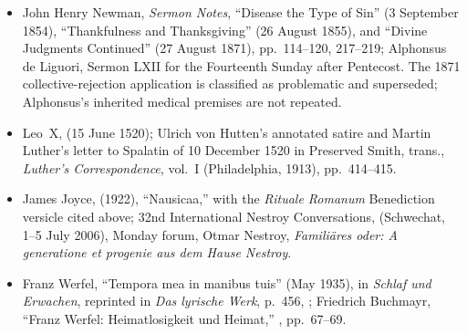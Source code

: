 {\begin{itemize}[itemsep=0em,topsep=0.15em,parsep=0pt]
\item John Henry Newman, \emph{Sermon Notes}, ``Disease the Type of Sin''
(3 September 1854), ``Thankfulness and Thanksgiving'' (26 August 1855),
and ``Divine Judgments Continued'' (27 August 1871), pp.~114--120, 217--219;
Alphonsus de Liguori, Sermon LXII for the Fourteenth Sunday after Pentecost.
The 1871 collective-rejection application is classified as problematic and
superseded; Alphonsus's inherited medical premises are not repeated.

\item Leo~X,
 (15 June 1520); Ulrich von Hutten's annotated satire and Martin
Luther's letter to Spalatin of 10 December 1520 in Preserved Smith, trans.,
\emph{Luther's Correspondence}, vol.~I (Philadelphia, 1913), pp.~414--415.

\item James Joyce,
 (1922),
``Nausicaa,'' with the \emph{Rituale Romanum} Benediction versicle cited
above; 32nd International Nestroy Conversations,
(Schwechat, 1--5 July 2006), Monday forum, Otmar Nestroy, \emph{Familiäres
oder: A generatione et progenie aus dem Hause Nestroy}.

\item Franz Werfel, ``Tempora mea in manibus tuis'' (May 1935), in
\emph{Schlaf und Erwachen}, reprinted in \emph{Das lyrische Werk}, p.~456,
;
Friedrich Buchmayr, ``Franz Werfel: Heimatlosigkeit und Heimat,''
,
pp.~67--69.
\end{itemize}}
